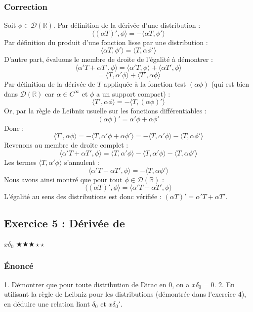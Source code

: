 \documentclass[11pt,a4paper]{article}
\begin{document}
\subsubsection*{Correction}
Soit $\phi \in \mathcal{D}(\mathbb{R})$.
Par définition de la dérivée d'une distribution :
$$ \langle (\alpha T)', \phi \rangle = - \langle \alpha T, \phi' \rangle $$
Par définition du produit d'une fonction lisse par une distribution :
$$ \langle \alpha T, \phi' \rangle = \langle T, \alpha \phi' \rangle $$
D'autre part, évaluons le membre de droite de l'égalité à démontrer :
$$ \langle \alpha' T + \alpha T', \phi \rangle = \langle \alpha' T, \phi \rangle + \langle \alpha T', \phi \rangle $$
$$ = \langle T, \alpha' \phi \rangle + \langle T', \alpha \phi \rangle $$
Par définition de la dérivée de $T$ appliquée à la fonction test $(\alpha \phi)$ (qui est bien dans $\mathcal{D}(\mathbb{R})$ car $\alpha \in C^\infty$ et $\phi$ a un support compact) :
$$ \langle T', \alpha \phi \rangle = - \langle T, (\alpha \phi)' \rangle $$
Or, par la règle de Leibniz usuelle sur les fonctions différentiables :
$$ (\alpha \phi)' = \alpha' \phi + \alpha \phi' $$
Donc :
$$ \langle T', \alpha \phi \rangle = - \langle T, \alpha' \phi + \alpha \phi' \rangle = - \langle T, \alpha' \phi \rangle - \langle T, \alpha \phi' \rangle $$
Revenons au membre de droite complet :
$$ \langle \alpha' T + \alpha T', \phi \rangle = \langle T, \alpha' \phi \rangle - \langle T, \alpha' \phi \rangle - \langle T, \alpha \phi' \rangle $$
Les termes $\langle T, \alpha' \phi \rangle$ s'annulent :
$$ \langle \alpha' T + \alpha T', \phi \rangle = - \langle T, \alpha \phi' \rangle $$
Nous avons ainsi montré que pour tout $\phi \in \mathcal{D}(\mathbb{R})$ :
$$ \langle (\alpha T)', \phi \rangle = \langle \alpha' T + \alpha T', \phi \rangle $$
L'égalité au sens des distributions est donc vérifiée : $(\alpha T)' = \alpha' T + \alpha T'$.


\subsection*{Exercice 5 : Dérivée de}$x \delta_0$  \quad $\bigstar\bigstar\bigstar\star\star$


\subsubsection*{Énoncé}
1. Démontrer que pour toute distribution de Dirac en $0$, on a $x \delta_0 = 0$.
2. En utilisant la règle de Leibniz pour les distributions (démontrée dans l'exercice 4), en déduire une relation liant $\delta_0$ et $x \delta_0'$.
\end{document}
